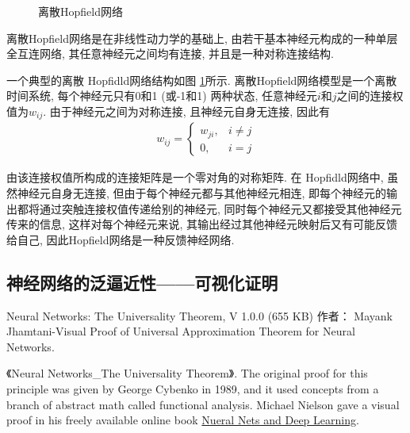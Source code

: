 \begin{figure}[H]
\begin{center}
\caption{离散Hopfield网络}
\label{AI32fig201912022608}
\end{center}
\end{figure}
离散Hopfield网络是在非线性动力学的基础上, 由若干基本神经元构成的一种单层全互连网络, 其任意神经元之间均有连接, 并且是一种对称连接结构.

\begin{example}
一个典型的离散 Hopfidld网络结构如图 \ref{AI32fig201912022608}所示.
离散Hopfield网络模型是一个离散时间系统, 每个神经元只有0和1 (或-1和1) 两种状态, 任意神经元$i$和$j$之间的连接权值为$w_{ij}$.
由于神经元之间为对称连接, 且神经元自身无连接, 因此有
\begin{align}
  w_{i j}=\left\{
  \begin{array}{ll}
  {w_{j i}}, & i \neq j \\
    {0}, &  i=j
    \end{array}\right.
\end{align}
\end{example}
由该连接权值所构成的连接矩阵是一个零对角的对称矩阵. 在 Hopfidld网络中, 虽然神经元自身无连接, 但由于每个神经元都与其他神经元相连, 即每个神经元的输出都将通过突触连接权值传递给别的神经元, 同时每个神经元又都接受其他神经元传来的信息, 这样对每个神经元来说, 其输出经过其他神经元映射后又有可能反馈给自己, 因此Hopfield网络是一种反馈神经网络.

\subsection{神经网络的泛逼近性——可视化证明}
Neural Networks: The Universality Theorem, V 1.0.0 (655 KB) 作者： Mayank Jhamtani-Visual Proof of Universal Approximation Theorem for Neural Networks.

《Neural Networks\_The Universality Theorem》. The original proof for this principle was given by George Cybenko in 1989, and it used concepts from a branch of abstract math called functional analysis.
Michael Nielson gave a visual proof in his freely available online book \href{http://neuralnetworksanddeeplearning.com/chap4.html}{Nueral Nets and Deep Learning}.
